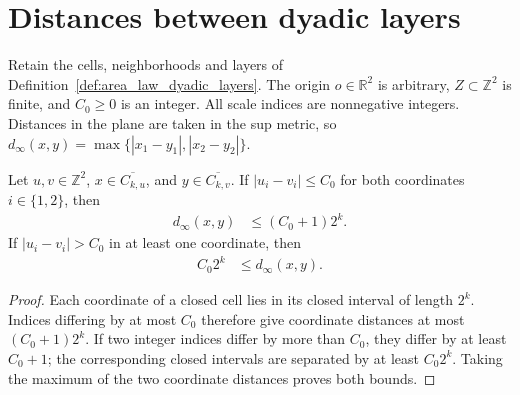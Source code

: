 \section{Distances between dyadic layers}
\label{sec:area_law_layer_distance}

Retain the cells, neighborhoods and layers of
Definition~\ref{def:area_law_dyadic_layers}. The origin $o\in\mathbb R^2$ is
arbitrary, $Z\subset\mathbb Z^2$ is finite, and $C_0\ge0$ is an integer.
All scale indices are nonnegative integers. Distances in the plane are taken
in the sup metric, so $d_\infty(x,y)=\max\{|x_1-y_1|,|x_2-y_2|\}$.

\begin{lemma}
    \label{thm:area_law_dyadic_cell_distance}
    \leanok
    Let $u,v\in\mathbb Z^2$, $x\in\overline{C_{k,u}}$, and
    $y\in\overline{C_{k,v}}$. If $|u_i-v_i|\le C_0$ for both coordinates
    $i\in\{1,2\}$, then
    \begin{align}
        d_\infty(x,y) & \le (C_0+1)2^k.
    \end{align}
    If $|u_i-v_i|>C_0$ in at least one coordinate, then
    \begin{align}
        C_0 2^k & \le d_\infty(x,y).
    \end{align}
\end{lemma}
\begin{proof}\leanok
    Each coordinate of a closed cell lies in its closed interval of length
    $2^k$. Indices differing by at most $C_0$ therefore give coordinate
    distances at most $(C_0+1)2^k$. If two integer indices differ by more
    than $C_0$, they differ by at least $C_0+1$; the corresponding closed
    intervals are separated by at least $C_0 2^k$. Taking the maximum of
    the two coordinate distances proves both bounds.
\end{proof}

